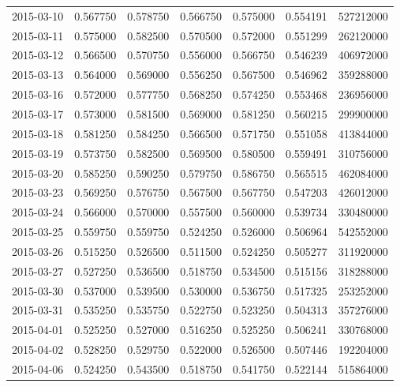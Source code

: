 \begin{tabular}{lrrrrrr}
2015-03-10 &    0.567750 &    0.578750 &    0.566750 &    0.575000 &    0.554191 &   527212000 \\
2015-03-11 &    0.575000 &    0.582500 &    0.570500 &    0.572000 &    0.551299 &   262120000 \\
2015-03-12 &    0.566500 &    0.570750 &    0.556000 &    0.566750 &    0.546239 &   406972000 \\
2015-03-13 &    0.564000 &    0.569000 &    0.556250 &    0.567500 &    0.546962 &   359288000 \\
2015-03-16 &    0.572000 &    0.577750 &    0.568250 &    0.574250 &    0.553468 &   236956000 \\
2015-03-17 &    0.573000 &    0.581500 &    0.569000 &    0.581250 &    0.560215 &   299900000 \\
2015-03-18 &    0.581250 &    0.584250 &    0.566500 &    0.571750 &    0.551058 &   413844000 \\
2015-03-19 &    0.573750 &    0.582500 &    0.569500 &    0.580500 &    0.559491 &   310756000 \\
2015-03-20 &    0.585250 &    0.590250 &    0.579750 &    0.586750 &    0.565515 &   462084000 \\
2015-03-23 &    0.569250 &    0.576750 &    0.567500 &    0.567750 &    0.547203 &   426012000 \\
2015-03-24 &    0.566000 &    0.570000 &    0.557500 &    0.560000 &    0.539734 &   330480000 \\
2015-03-25 &    0.559750 &    0.559750 &    0.524250 &    0.526000 &    0.506964 &   542552000 \\
2015-03-26 &    0.515250 &    0.526500 &    0.511500 &    0.524250 &    0.505277 &   311920000 \\
2015-03-27 &    0.527250 &    0.536500 &    0.518750 &    0.534500 &    0.515156 &   318288000 \\
2015-03-30 &    0.537000 &    0.539500 &    0.530000 &    0.536750 &    0.517325 &   253252000 \\
2015-03-31 &    0.535250 &    0.535750 &    0.522750 &    0.523250 &    0.504313 &   357276000 \\
2015-04-01 &    0.525250 &    0.527000 &    0.516250 &    0.525250 &    0.506241 &   330768000 \\
2015-04-02 &    0.528250 &    0.529750 &    0.522000 &    0.526500 &    0.507446 &   192204000 \\
2015-04-06 &    0.524250 &    0.543500 &    0.518750 &    0.541750 &    0.522144 &   515864000 \\

\end{tabular}
